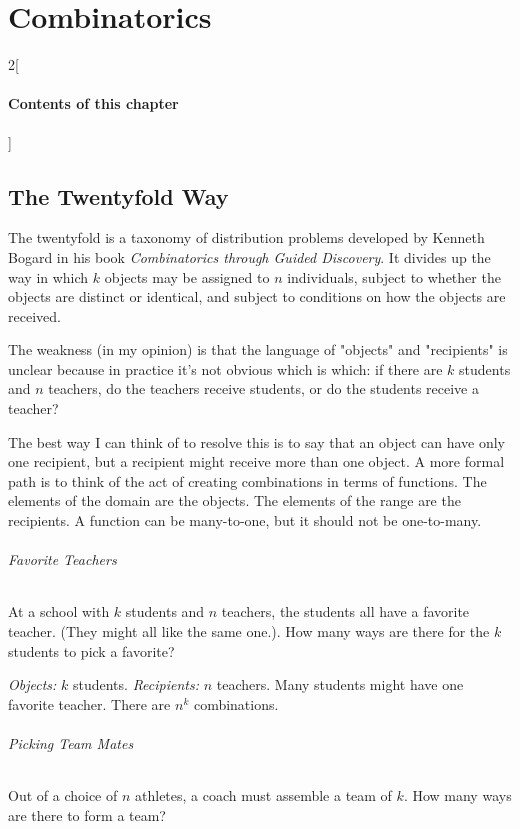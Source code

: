 \chapter{Combinatorics}

\begin{multicols}{2}[\subsubsection*{Contents of this chapter}]
\end{multicols}


\section{The Twentyfold Way}

The twentyfold is a taxonomy of distribution problems developed by Kenneth Bogard in his book \textit{Combinatorics through Guided Discovery}. It divides up the way in which $k$ objects may be assigned to $n$ individuals, subject to whether the objects are distinct or identical, and subject to conditions on how the objects are received.

The weakness (in my opinion) is that the language of "objects" and "recipients" is unclear because in practice it's not obvious which is which: if there are $k$ students and $n$ teachers, do the teachers receive students, or do the students receive a teacher? 

The best way I can think of to resolve this is to say that an object can have only one recipient, but a recipient might receive more than one object. A more formal path is to think of the act of creating combinations in terms of functions. The elements of the domain are the objects. The elements of the range are the recipients. A function can be many-to-one, but it should not be one-to-many. 

\subparagraph{Favorite Teachers} At a school with $k$ students and $n$ teachers, the students all have a favorite teacher. (They might all like the same one.). How many ways are there for the $k$ students to pick a favorite? 

\textit{Objects:} $k$ students. \textit{Recipients:} $n$ teachers. Many students might have one favorite teacher. There are $n^k$ combinations. 

\subparagraph{Picking Team Mates} Out of a choice of $n$ athletes, a coach must assemble a team of $k$. How many ways are there to form a team? 

